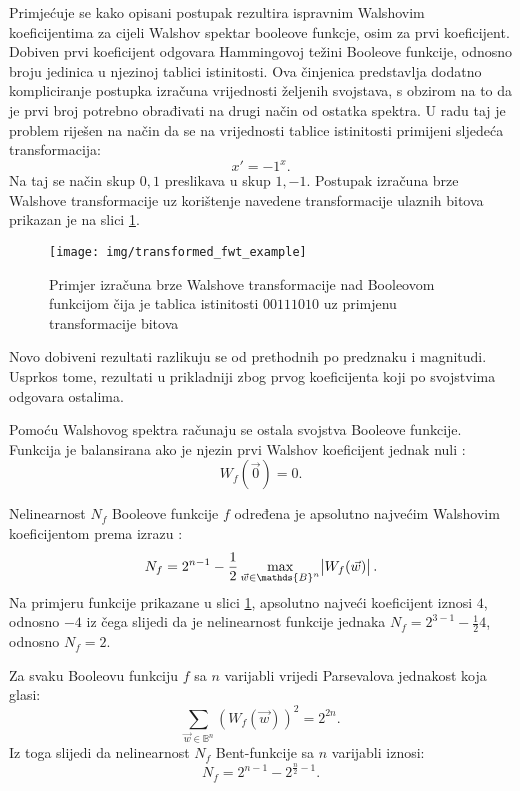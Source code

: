 Primjećuje se kako opisani postupak rezultira ispravnim Walshovim koeficijentima za cijeli Walshov spektar booleove funkcje, osim za prvi koeficijent.
Dobiven prvi koeficijent odgovara Hammingovoj težini Booleove funkcije, odnosno broju jedinica u njezinoj tablici istinitosti.
Ova činjenica predstavlja dodatno kompliciranje postupka izračuna vrijednosti željenih svojstava, s obzirom na to da je prvi broj potrebno obrađivati na drugi način od ostatka spektra.
U radu \cite{MeasuringBoolean} taj je problem riješen na način da se na vrijednosti tablice istinitosti primijeni sljedeća transformacija:
\begin{equation}
    x' = -1^x.
\end{equation}
Na taj se način skup ${0, 1}$ preslikava u skup ${1, -1}$.
Postupak izračuna brze Walshove transformacije uz korištenje navedene transformacije ulaznih bitova prikazan je na slici \ref{fig:transformed_fwt_example}.
\begin{figure}[ht!] 
    \centering
    \texttt{[image: img/transformed\_fwt\_example]}
    \captionsetup{justification=centering}
    \caption{Primjer izračuna brze Walshove transformacije nad Booleovom funkcijom čija je tablica istinitosti $00111010$ uz primjenu transformacije bitova}
    \label{fig:transformed_fwt_example}
\end{figure}
Novo dobiveni rezultati razlikuju se od prethodnih po predznaku i magnitudi.
Usprkos tome, rezultati u prikladniji zbog prvog koeficijenta koji po svojstvima odgovara ostalima.

Pomoću Walshovog spektra računaju se ostala svojstva Booleove funkcije.
Funkcija je balansirana ako je njezin prvi Walshov koeficijent jednak nuli \cite{MaximalNonlinearity}:
\begin{equation}
    W_f(\vec{0}) = 0.
\end{equation} 

Nelinearnost $N_f$ Booleove funkcije $f$ određena je apsolutno najvećim Walshovim koeficijentom prema izrazu \cite{MaximalNonlinearity}:
\begin{equation}
    N_f = 2^{n-1} - \frac{1}{2}\max_{\vec{w} \in \mathds{B}^n} \abs{W_f(\vec{w})}.
\end{equation}
Na primjeru funkcije prikazane u slici \ref{fig:transformed_fwt_example}, apsolutno najveći koeficijent iznosi $4$, odnosno $-4$ iz čega slijedi da je nelinearnost funkcije jednaka $N_f = 2^{3-1} - \frac{1}{2}4$, odnosno $N_f = 2$.

Za svaku Booleovu funkciju $f$ sa $n$ varijabli vrijedi Parsevalova jednakost koja glasi:
\begin{equation}
    \sum_{\vec{w}\in \mathds{B}^n} \left( W_f(\vec{w}) \right)^2 = 2^{2n}.
\end{equation} 
Iz toga slijedi da nelinearnost $N_f$ Bent-funkcije sa $n$ varijabli iznosi:
\begin{equation}
    N_f = 2^{n-1} - 2^{\frac{n}{2}-1}.
\end{equation}
